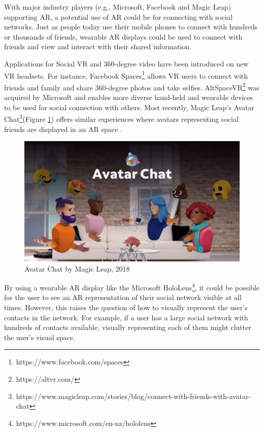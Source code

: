 
With major industry players (e.g., Microsoft, Facebook and Magic Leap) supporting AR, a potential use of AR could be for connecting with social networks. Just as people today use their mobile phones to connect with hundreds or thousands of friends, wearable AR displays could be used to connect with friends and view and interact with their shared information.

Applications for Social VR and 360-degree video have been introduced on new VR headsets. For instance, Facebook Spaces\footnote{https://www.facebook.com/spaces} allows VR users to connect with friends and family and share 360-degree photos and take selfies. AltSpaceVR\footnote{https://altvr.com/} was acquired by Microsoft and enables more diverse hand-held and wearable devices to be used for social connection with others. Most recently, Magic Leap's Avatar Chat\footnote{https://www.magicleap.com/stories/blog/connect-with-friends-with-avatar-chat}(Figure \ref{fig:ml-avatar-chat}) offers similar experiences where avatars representing social friends are displayed in an AR space . 

\begin{figure}
    \centering
    \includegraphics[width=.8\linewidth]{images/magic-leap-avatar-chat.jpg}
    \caption{Avatar Chat by Magic Leap, 2018}
    \label{fig:ml-avatar-chat}
\end{figure}

By using a wearable AR display like the Microsoft HoloLens\footnote{https://www.microsoft.com/en-nz/hololens}, it could be possible for the user to see an AR representation of their social network visible at all times. However, this raises the question of how to visually represent the user's contacts in the network. For example, if a user has a large social network with hundreds of contacts available, visually representing each of them might clutter the user's visual space.

